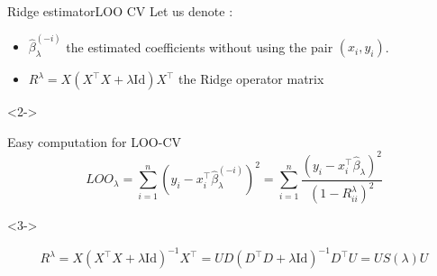 \documentclass[10pt,aspectratio=43]{beamer}
\begin{document}
\begin{frame}{Ridge estimator}{LOO CV}
    Let us denote :
    \begin{itemize}
        \item $\hat \beta_\lambda^{(-i)}$ the estimated coefficients without using the pair $(x_i, y_i)$.
        \item $R^\lambda =  X(X^\top X + \lambda \mathrm{Id})X^\top$ the Ridge operator matrix
    \end{itemize}
    \begin{onlyenv}<2->
        \begin{block}{Easy computation for LOO-CV}
        $$ LOO_\lambda
        = \sum_{i=1}^n (y_i - x_i^\top \hat \beta_\lambda^{(-i)} )^2
        = \sum_{i=1}^n \frac{(y_i - x_i^\top \hat \beta_\lambda)^2}{(1 - R^\lambda_{ii})^2} $$
        \end{block}
    \end{onlyenv}
    \begin{onlyenv}<3->
        \begin{block}{}
        $$ R^\lambda
        =  X(X^\top X + \lambda \mathrm{Id})^{-1}X^\top
        = UD(D^\top D + \lambda \mathrm{Id})^{-1} D^\top U
        = U S(\lambda) U$$
        \end{block}
    \end{onlyenv}
\end{frame}
\end{document}
